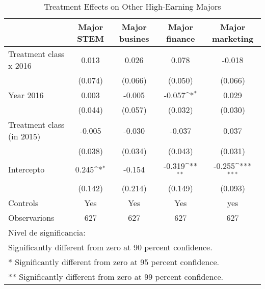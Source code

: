 \begin{table}[]
\caption{Treatment Effects on Other High-Earning Majors}
{
\def\sym#1{\ifmmode^{#1}\else\(^{#1}\)\fi}
\begin{tabular}{@{\extracolsep{2pt}}l*{4}{c}@{}}
\hline\hline


 & Major STEM & Major busines & Major finance & Major marketing \\
\hline
Treatment class x 2016 & 0.013 & 0.026 & 0.078 & -0.018 \\
 & (0.074) & (0.066) & (0.050) & (0.066) \\
Year 2016 & 0.003 & -0.005 & -0.057\sym{*} & 0.029 \\
 & (0.044) & (0.057) & (0.032) & (0.030) \\
Treatment class (in 2015) & -0.005 & -0.030 & -0.037 & 0.037 \\
 & (0.038) & (0.034) & (0.043) & (0.031) \\
Intercepto & 0.245\sym{*} & -0.154 & -0.319\sym{**} & -0.255\sym{***} \\
 & (0.142) & (0.214) & (0.149) & (0.093) \\
Controls & Yes & Yes & Yes & yes \\

\hline
Observarions & 627 & 627 & 627 & 627 \\
\hline\hline
\multicolumn{5}{l}{\footnotesize Nivel de significancia:}\vspace{-.25em} \\
\multicolumn{5}{l}{\footnotesize * Significantly different from zero at 90 percent confidence.}\vspace{-.25em} \\
\multicolumn{5}{l}{\footnotesize ** Significantly different from zero at 95 percent confidence.}\vspace{-.25em} \\
\multicolumn{5}{l}{\footnotesize *** Significantly different from zero at 99 percent confidence.}
\end{tabular}
}
\end{table}